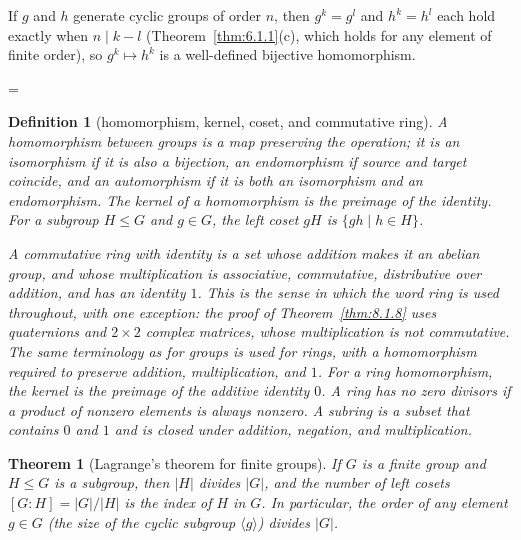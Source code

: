 \documentclass[11pt]{article}
\makeatletter
\theoremstyle{ntstyle}
\newtheorem{theorem}{Theorem}[subsection]
\newtheorem{definition}{Definition}[subsection]
\let\nt@closedisplay\]
\def\nt@guardedclose{\@ifnextchar\par{\nt@closeafterpar}{\@ifnextchar\end{\postdisplaypenalty\@M\nt@closedisplay}{\nt@closedisplay}}}
\def\nt@closeafterpar\par{\@ifnextchar\par{\nt@closeafterpar}{\@ifnextchar\end{\postdisplaypenalty\@M\nt@closedisplay\par}{\nt@closedisplay\par}}}
\renewenvironment{proof}[1][\proofname]{\par
  \pushQED{\qed}\normalfont\topsep\medskipamount\edef\nt@afterproof{\@endparpenalty=\the\@endparpenalty\relax}\@beginparpenalty\@M\@endparpenalty\@M\let\]\nt@guardedclose\trivlist\item[]\textit{#1\@addpunct{.}} \ignorespaces}{\ifvmode\addpenalty\@M\fi\popQED\nt@afterproof\endtrivlist\@endpefalse}
\makeatother
\begin{document}
\begin{proof} If $g$ and $h$ generate cyclic
	groups of order $n$, then $g^k=g^l$ and $h^k=h^l$ each hold exactly when
	$n\mid k-l$ (Theorem~\ref{thm:6.1.1}(c), which holds for any element of finite
	order), so $g^k\mapsto h^k$ is a well-defined bijective homomorphism.

\end{proof}
\begin{definition}[homomorphism, kernel, coset, and commutative ring]\label{def:6.6.4}
	A homomorphism between groups is a map preserving the operation; it is
	an isomorphism if it is also a bijection, an endomorphism if source and
	target coincide, and an automorphism if it is both an isomorphism and an endomorphism. The kernel of a
	homomorphism is the preimage of the identity. For a subgroup $H\le G$
	and $g\in G$, the left coset $gH$ is $\{gh\mid h\in H\}$.

	A commutative ring with identity is a set whose addition makes it an
	abelian group, and whose multiplication is associative, commutative,
	distributive over addition, and has an identity $1$.
	This is the sense in which the word ring is used throughout, with
	one exception: the proof of Theorem~\ref{thm:8.1.8} uses quaternions and $2 \times 2$
	complex matrices, whose multiplication is not commutative.
	The same terminology as for groups is used for rings, with a
	homomorphism required
	to preserve addition, multiplication, and $1$. For a ring homomorphism, the kernel is the preimage
	of the additive identity $0$. A ring has no zero divisors if a product
	of nonzero elements is always nonzero. A subring is a subset that
	contains $0$ and $1$ and is closed under addition, negation, and
	multiplication.

\end{definition}


\begin{theorem}[Lagrange's theorem for finite groups]\label{thm:6.6.2} If $G$ is a
	finite group and $H \le G$ is a subgroup, then $|H|$ divides $|G|$, and
	the number of left cosets $[G:H] = |G|/|H|$ is the index of $H$ in
	$G$. In particular, the order of any element $g \in G$ (the size of
	the cyclic subgroup $\langle g\rangle$) divides $|G|$.

\end{theorem}
\end{document}
